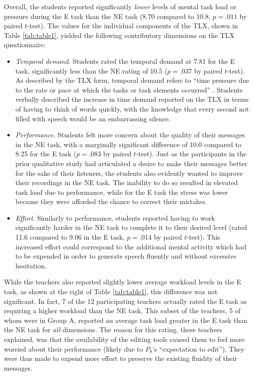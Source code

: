 Overall, the students reported significantly \emph{lower} levels of mental task load or pressure during the E task than the NE task (8.70 compared to 10.8, $p=.011$ by paired $t$-test). 
The values for the individual components of the TLX, shown in Table \ref{tab:table1}, yielded the following contributory dimensions on the TLX questionnaire:

\begin{itemize}
	\item \emph{Temporal demand}. Students rated the temporal demand at 7.81 for the E task, significantly less than the NE rating of 10.5 ($p=.037$ by paired $t$-test). 
	As described by the TLX form, temporal demand refers to ``time pressure due to the rate or pace at which the tasks or task elements occurred'' \cite{nasatlx}.
	Students verbally described the increase in time demand reported on the TLX in terms of having to think of words quickly, with the knowledge that every second not filled with speech would be an embarrassing silence.
	\item \emph{Performance}. Students felt more concern about the quality of their messages in the NE task, with a marginally significant difference of 10.0 compared to 8.25 for the E task ($p=.083$ by paired $t$-test). 
	Just as the participants in the prior qualitative study had articulated a desire to make their messages better for the sake of their listeners, the students also evidently wanted to improve their recordings in the NE task. 
	The inability to do so resulted in elevated task load due to performance, while for the E task the stress was lower because they were afforded the chance to correct their mistakes.
	\item \emph{Effort}. Similarly to performance, students reported having to work significantly harder in the NE task to complete it to their desired level (rated 11.6 compared to 9.06 in the E task, $p=.014$ by paired $t$-test). 
	This increased effort could correspond to the additional mental activity which had to be expended in order to generate speech fluently and without excessive hesitation.
\end{itemize}

While the teachers also reported slightly lower average workload levels in the E task, as shown at the right of Table \ref{tab:table1}, this difference was not significant.
In fact, 7 of the 12 participating teachers actually rated the E task as requiring a higher workload than the NE task.
This subset of the teachers, 5 of whom were in Group A, reported an average task load greater in the E task than the NE task for \emph{all} dimensions.
The reason for this rating, these teachers explained, was that the availability of the editing tools caused them to feel more worried about their performance (likely due to $P_8$'s ``expectation to edit'').
They were thus made to expend more effort to preserve the existing fluidity of their messages.

